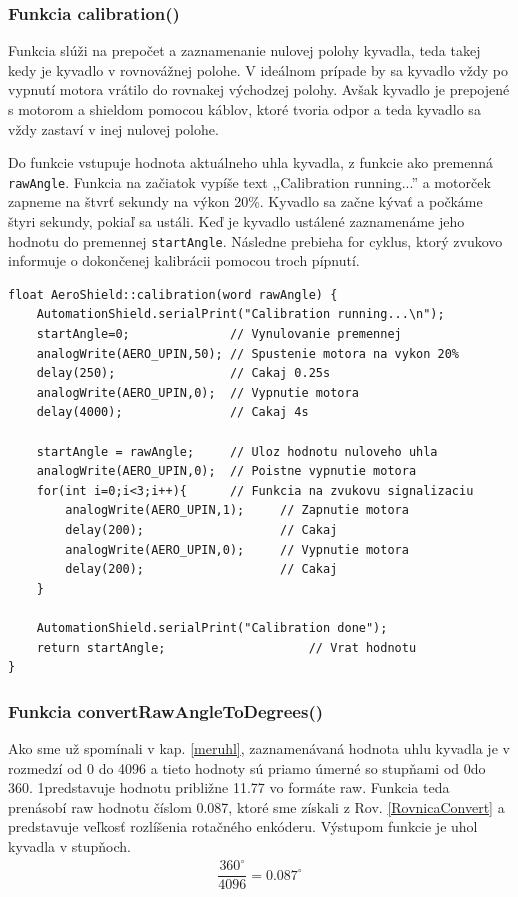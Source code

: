 \subsubsection{Funkcia calibration()}

Funkcia  slúži na prepočet a zaznamenanie nulovej polohy kyvadla, teda takej kedy je kyvadlo v rovnovážnej polohe. V ideálnom prípade by sa kyvadlo vždy po vypnutí motora vrátilo do rovnakej východzej polohy. Avšak kyvadlo je prepojené s motorom a shieldom pomocou káblov, ktoré tvoria odpor a teda kyvadlo sa vždy zastaví v inej nulovej polohe. 

Do funkcie vstupuje hodnota aktuálneho uhla kyvadla, z funkcie  ako premenná \verb|rawAngle|. Funkcia na začiatok vypíše text ,,Calibration running...'' a motorček zapneme na štvrť sekundy na výkon 20\%. Kyvadlo sa začne kývať a počkáme štyri sekundy, pokiaľ sa ustáli. Keď je kyvadlo ustálené zaznamenáme jeho hodnotu do premennej \verb|startAngle|. Následne prebieha for cyklus, ktorý zvukovo informuje o dokončenej kalibrácii pomocou troch pípnutí. 

\begin{lstlisting}[caption={Zdrojový kód funkcie calibration.},captionpos=b]
float AeroShield::calibration(word rawAngle) {  
	AutomationShield.serialPrint("Calibration running...\n");  
	startAngle=0;              // Vynulovanie premennej 
	analogWrite(AERO_UPIN,50); // Spustenie motora na vykon 20%
	delay(250);                // Cakaj 0.25s 
	analogWrite(AERO_UPIN,0);  // Vypnutie motora
	delay(4000);               // Cakaj 4s
	
	startAngle = rawAngle;     // Uloz hodnotu nuloveho uhla
	analogWrite(AERO_UPIN,0);  // Poistne vypnutie motora 
	for(int i=0;i<3;i++){      // Funkcia na zvukovu signalizaciu
		analogWrite(AERO_UPIN,1);     // Zapnutie motora
		delay(200);                   // Cakaj
		analogWrite(AERO_UPIN,0);     // Vypnutie motora
		delay(200);                   // Cakaj
	}
	
	AutomationShield.serialPrint("Calibration done");
	return startAngle;                    // Vrat hodnotu 
}
\end{lstlisting}

\subsubsection{Funkcia convertRawAngleToDegrees()}

Ako sme už spomínali v kap. \ref{meruhl}, zaznamenávaná hodnota uhlu kyvadla je v rozmedzí od 0 do 4096 a tieto hodnoty sú priamo úmerné so stupňami od 0\textdegree  do 360\textdegree. 1\textdegree   predstavuje hodnotu približne 11.77 vo formáte raw. Funkcia teda prenásobí raw hodnotu číslom 0.087\textdegree, ktoré sme získali z Rov. \ref{RovnicaConvert} a predstavuje veľkosť rozlíšenia rotačného enkóderu. Výstupom funkcie je uhol kyvadla v stupňoch.
 \begin{align}
 	\label{RovnicaConvert}
 	  \dfrac{360^{\circ}}{4096} = 0.087^{\circ}
 \end{align}

